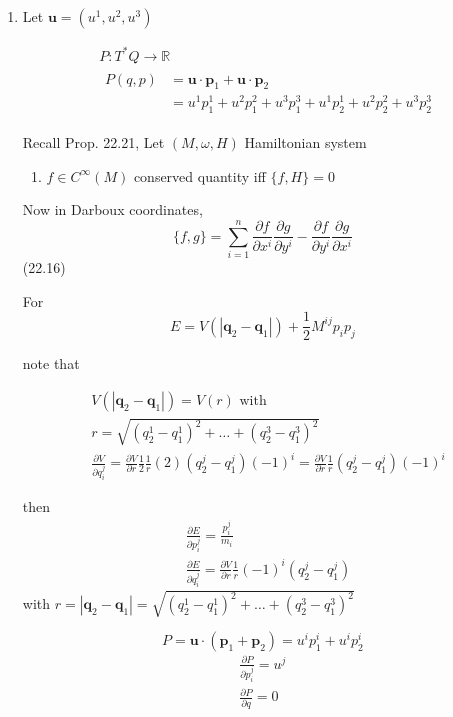 \documentclass[11pt]{amsart}
\theoremstyle{definition}
\begin{document}
\begin{enumerate}
\item[(a)] Let $\mathbf{u} = (u^1,u^2,u^3)$

\[
\begin{aligned}
  & P : T^*Q \to \mathbb{R} \\
  & \begin{aligned} P(q,p) & = \mathbf{u}\cdot \mathbf{p}_1 + \mathbf{u}\cdot \mathbf{p}_2 \\
      & = u^1p_1^1 + u^2p_1^2 + u^3 p_1^3 +u^1p_2^1 + u^2 p_2^2 + u^3 p_2^3 \end{aligned}
\end{aligned}
\]

 Recall Prop. 22.21, Let $(M,\omega, H)$ Hamiltonian system
\begin{enumerate}
\item[(a)] $f \in C^{\infty}(M)$ conserved quantity iff $\lbrace f, H\rbrace =0$
\end{enumerate}

Now in Darboux coordinates,
\[
\lbrace f, g \rbrace = \sum_{i=1}^n \frac{ \partial f}{ \partial x^i} \frac{ \partial g}{ \partial y^i } - \frac{ \partial f}{ \partial y^i } \frac{ \partial g}{ \partial x^i}
\]
(22.16)

For
\[
E = V(|\mathbf{q}_2 - \mathbf{q}_1|) + \frac{1}{2} M^{ij}p_ip_j
\]

note that

\[
\begin{aligned}
  & V(| \mathbf{q}_2 - \mathbf{q}_1|) = V(r) \text{ with } \\
  & r = \sqrt{ (q_2^1 - q_1^1)^2 + \dots + (q_2^3 - q_1^3)^2 } \\
  & \frac{ \partial V}{ \partial q_i^j} = \frac{ \partial V}{ \partial r} \frac{1}{2} \frac{1}{r}(2)(q_2^j - q_1^j)(-1)^i = \frac{ \partial V}{ \partial r} \frac{1}{r} (q_2^j-q_1^j)(-1)^i
\end{aligned}
\]



then
\[
\begin{aligned}
  & \frac{ \partial E}{ \partial p_i^j} = \frac{p_i^j}{m_i} \\
  & \frac{ \partial E}{ \partial q_i^j} = \frac{ \partial V}{ \partial r} \frac{1}{r}(-1)^i (q_2^j-q_1^j)
\end{aligned}
\]
with $r = |\mathbf{q}_2 - \mathbf{q}_1| = \sqrt{ (q_2^1- q_1^1)^2 + \dots + (q_2^3- q_1^3)^2 }$

\[
P = \mathbf{u}\cdot (\mathbf{p}_1 + \mathbf{p}_2) = u^i p^i_1 + u^i p_2^i
\]
\[
\begin{aligned}
\frac{ \partial P}{ \partial p_i^j} = u^j  \\
 \frac{ \partial P}{ \partial q }=  0
\end{aligned}
\]


\end{enumerate}
\end{document}
